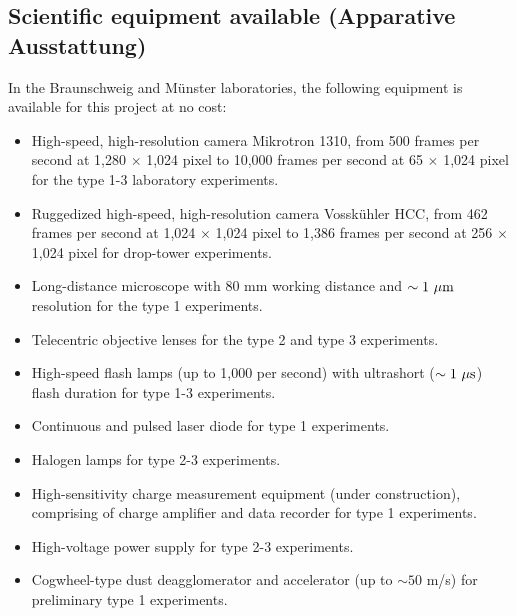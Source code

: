 \subsection{\label{equipb1}Scientific equipment available (Apparative Ausstattung)}
%
%
In the Braunschweig and M\"unster laboratories, the following
equipment is available for this project at no cost:
\begin{itemize}

\item High-speed, high-resolution camera Mikrotron 1310, from 500
frames per second at 1,280 $\times$ 1,024 pixel to 10,000 frames
per second at 65 $\times$ 1,024 pixel for the type 1-3 laboratory
experiments.

\item Ruggedized high-speed, high-resolution camera Vossk\"uhler
HCC, from 462 frames per second at 1,024 $\times$ 1,024 pixel to
1,386 frames per second at 256 $\times$ 1,024 pixel for drop-tower
experiments.

\item Long-distance microscope with 80 mm working distance and
$\sim 1~\rm \mu m$ resolution for the type 1 experiments.

\item Telecentric objective lenses for the type 2 and type 3
experiments.

\item High-speed flash lamps (up to 1,000 per second) with
ultrashort ($\sim 1~\rm \mu s$) flash duration for type 1-3
experiments.

\item Continuous and pulsed laser diode for type 1 experiments.

\item Halogen lamps for type 2-3 experiments.

\item High-sensitivity charge measurement equipment (under
construction), comprising of charge amplifier and data recorder
for type 1 experiments.

\item High-voltage power supply for type 2-3 experiments.

\item Cogwheel-type dust deagglomerator and accelerator (up to
$\sim 50$ m/s) for preliminary type 1 experiments.


\end{itemize}
